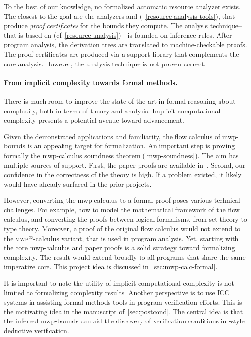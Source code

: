 To the best of our knowledge, no formalized automatic resource analyzer exists.
The closest to the goal are the analyzers  and 
(\cf~\autoref{resource-analysis-tools}), that produce \emph{proof certificates}
for the bounds they compute. The analysis technique--that is based on
(cf~\autoref{resource-analysis})---is founded on inference rules. After program
analysis, the derivation trees are translated to machine-checkable proofs. The
proof certificates are produced via a support library that complements the core
analysis. However, the analysis {technique} is not proven correct.

\paragraph*{From implicit complexity towards formal methods.}
There is much room to improve the state-of-the-art in formal reasoning about
complexity, both in terms of theory and analysis. Implicit computational
complexity presents a potential avenue toward advancement.

Given the demonstrated applications and familiarity, the flow calculus of
mwp-bounds is an appealing target for formalization. An
important step is proving formally the mwp-calculus soundness
theorem (\autoref{mwp-soundness}). The aim has
multiple sources of support. First, the paper proofs are available
in~\cite{jones2009}. Second, our confidence in the correctness of the theory is
high. If a problem existed, it likely would have already surfaced in the prior
projects.

However, converting the mwp-calculus to a formal proof poses various technical
challenges. For example, how to model the mathematical framework of the flow
calculus, and converting the proofs between logical formalisms, from set theory
to type theory. Moreover, a proof of the original flow calculus would not extend
to the \textsc{mwp}$^\infty$-calculus variant, that is used in
program analysis. Yet, starting with the core mwp-calculus and paper proofs is a
solid strategy toward formalizing complexity. The result would extend broadly to
all programs that share the same imperative core. This project idea is discussed
in~\autoref{sec:mwp-calc-formal}.

It is important to note the utility of implicit computational complexity is not
limited to formalizing complexity results. Another perspective is to use ICC
systems in assisting formal methods tools in program verification efforts. This
is the motivating idea in the manuscript of~\autoref{sec:postcond}. The central
idea is that the inferred mwp-bounds can aid the discovery of verification
conditions in -style deductive verification.

